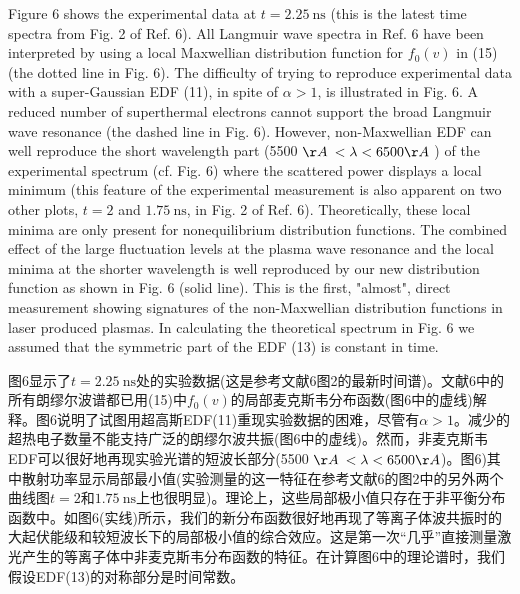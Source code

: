 \documentclass[oneside,onecolumn]{article}
\newcommand\enzhbox[2]{
	\quad\par \begin{paracol}{2} 
			\begin{spacing}{1.0}
					\footnotesize  #1
			\end{spacing}
			
		\switchcolumn[1] 
		#2
	\end{paracol} 
}
\begin{document}
\begin{sloppypar}
\enzhbox{
	 Figure 6 shows the experimental data at $t=2.25 \mathrm{~ns}$ (this is the latest time spectra from Fig. 2 of Ref. 6). All Langmuir wave spectra in Ref. 6 have been interpreted by using a local Maxwellian distribution function for $f_{0}(v)$ in (15) (the dotted line in Fig. 6). The difficulty of trying to reproduce experimental data with a super-Gaussian EDF (11), in spite of $\alpha>1$, is illustrated in Fig. 6. A reduced number of superthermal electrons cannot support the broad Langmuir wave resonance (the dashed line in Fig. 6). However, non-Maxwellian EDF can well reproduce the short wavelength part (5500 $\AA$ $<\lambda<6500 \AA$ ) of the experimental spectrum (cf. Fig. 6) where the scattered power displays a local minimum (this feature of the experimental measurement is also apparent on two other plots, $t=2$ and $1.75 \mathrm{~ns}$, in Fig. 2 of Ref. 6). Theoretically, these local minima are only present for nonequilibrium distribution functions. The combined effect of the large fluctuation levels at the plasma wave resonance and the local minima at the shorter wavelength is well reproduced by our new distribution function as shown in Fig. 6 (solid line). This is the first, "almost", direct measurement showing signatures of the non-Maxwellian distribution functions in laser produced plasmas. In calculating the theoretical spectrum in Fig. 6 we assumed that the symmetric part of the EDF (13) is constant in time.
	 }{

图6显示了$t=2.25 \mathrm{~ns}$处的实验数据(这是参考文献6图2的最新时间谱)。文献6中的所有朗缪尔波谱都已用(15)中$f_{0}(v)$的局部麦克斯韦分布函数(图6中的虚线)解释。图6说明了试图用超高斯EDF(11)重现实验数据的困难，尽管有$\alpha>1$。减少的超热电子数量不能支持广泛的朗缪尔波共振(图6中的虚线)。然而，非麦克斯韦EDF可以很好地再现实验光谱的短波长部分(5500 $\AA$ $<\lambda<6500 \AA$)。图6)其中散射功率显示局部最小值(实验测量的这一特征在参考文献6的图2中的另外两个曲线图$t=2$和$1.75 \mathrm{~ns}$上也很明显)。理论上，这些局部极小值只存在于非平衡分布函数中。如图6(实线)所示，我们的新分布函数很好地再现了等离子体波共振时的大起伏能级和较短波长下的局部极小值的综合效应。这是第一次“几乎”直接测量激光产生的等离子体中非麦克斯韦分布函数的特征。在计算图6中的理论谱时，我们假设EDF(13)的对称部分是时间常数。
}
  
  

\end{sloppypar}
\end{document}
